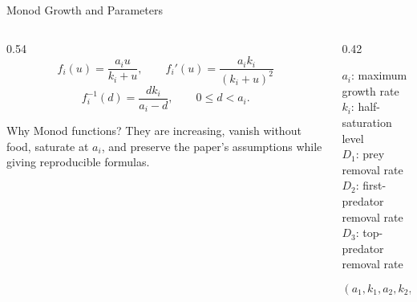 \begin{frame}{Monod Growth and Parameters}
  \begin{columns}[T,onlytextwidth]
    \begin{column}{0.54\textwidth}
      \vspace{0.15cm}
      \[
        f_i(u)=\frac{a_i u}{k_i+u},\qquad
        f_i'(u)=\frac{a_i k_i}{(k_i+u)^2}
      \]
      \[
        f_i^{-1}(d)=\frac{d k_i}{a_i-d},
        \qquad 0\le d<a_i.
      \]
      \vspace{0.25cm}
      \begin{block}{Why Monod functions?}
        They are increasing, vanish without food, saturate at $a_i$, and
        preserve the paper's assumptions while giving reproducible formulas.
      \end{block}
    \end{column}
    \begin{column}{0.42\textwidth}
      {\fontsize{11}{14}\selectfont
      \par
      $a_i$: maximum growth rate\\
      $k_i$: half-saturation level\\
      $D_1$: prey removal rate\\
      $D_2$: first-predator removal rate\\
      $D_3$: top-predator removal rate
      \vspace{0.35cm}

      \[
        (a_1,k_1,a_2,k_2,a_3,k_3,D_1,D_2,D_3)
      \]}
    \end{column}
  \end{columns}
\end{frame}

